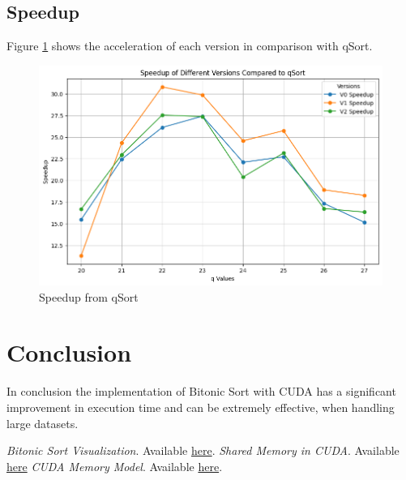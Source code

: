 \documentclass[a4paper,12pt]{article}
\begin{document}
\subsection{Speedup}
Figure \ref{fig:speedup} shows the acceleration of each version in comparison with qSort.

\begin{figure}
    \centering
    \includegraphics[width=1\linewidth]{assets/speedup.png}
    \caption{Speedup from qSort}
    \label{fig:speedup}
\end{figure}

\section{Conclusion}
In conclusion the implementation of Bitonic Sort with CUDA has a significant improvement in execution time and can be extremely effective, when handling large datasets.


\begin{thebibliography}{9}

 \textit{Bitonic Sort Visualization}. Available \href{https://www.sortvisualizer.com/bitonicsort/}{here}.
 \textit{Shared Memory in CUDA}. Available 
\href{https://developer.nvidia.com/blog/using-shared-memory-cuda-cc/}{here}
 \textit{CUDA Memory Model}. Available \href{https://www.3dgep.com/cuda-memory-model/}{here}.
\end{thebibliography}
\end{document}
